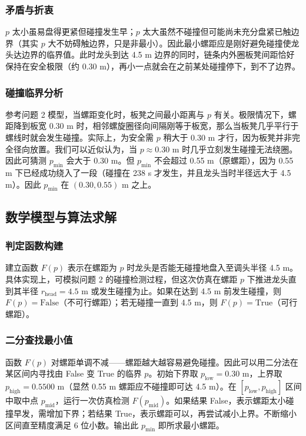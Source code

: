 \documentclass[UTF8]{ctexart}
\begin{document}
\subsubsection{矛盾与折衷}
$p$ 太小虽易盘得更紧但碰撞发生早；$p$ 太大虽然不碰撞但可能尚未充分盘紧已触边界（其实 $p$ 大不妨碍触边界，只是非最小）。因此最小螺距应是刚好避免碰撞使龙头达边界的临界值。此时龙头到达 4.5 m 边界的同时，链条内外圈板凳间距恰好保持在安全极限（约 0.30 m），再小一点就会在之前某处碰撞停下，到不了边界。

\subsubsection{碰撞临界分析}
参考问题 2 模型，当螺距变化时，板凳之间最小距离与 $p$ 有关。极限情况下，螺距降到板宽 0.30 m 时，相邻螺旋圈径向间隔刚等于板宽，那么当板凳几乎平行于螺线时就会发生碰撞。实际上，为安全需 $p$ 稍大于 0.30 m 才行，因为板凳并非完全径向放置。我们可以近似认为，当 $p \approx 0.30$ m 时几乎立刻发生碰撞无法绕圈。因此可猜测 $p_{\min}$ 会大于 0.30 m。但 $p_{\min}$ 不会超过 0.55 m（原螺距），因为 0.55 m 下已经成功绕入了一段（碰撞在 238 s 才发生，并且龙头当时半径远大于 4.5 m）。因此 $p_{\min}$ 在 $(0.30, 0.55)$ m 之上。

\subsection{数学模型与算法求解}

\subsubsection{判定函数构建}
建立函数 $F(p)$ 表示在螺距为 $p$ 时龙头是否能无碰撞地盘入至调头半径 4.5 m。具体实现上，可模拟问题 2 的碰撞检测过程，但这次仿真在螺距 $p$ 下推进龙头直到其半径 $r_{\text{head}}=4.5$ m 或发生碰撞为止。如果在达到 4.5 m 前发生碰撞，则 $F(p)=\text{False}$（不可行螺距）；若无碰撞一直到 4.5 m，则 $F(p)=\text{True}$（可行螺距）。

\subsubsection{二分查找最小值}
函数 $F(p)$ 对螺距单调不减——螺距越大越容易避免碰撞。因此可以用二分法在某区间内寻找由 False 变 True 的临界 $p$。初始下界取 $p_{\text{low}}=0.30$ m，上界取 $p_{\text{high}}=0.5500$ m（显然 0.55 m 螺距应不碰撞即可达 4.5 m）。在 $[p_{\text{low}},p_{\text{high}}]$ 区间中取中点 $p_{\text{mid}}$，运行一次仿真检测 $F(p_{\text{mid}})$。如果结果 False，表示螺距太小碰撞早发，需增加下界；若结果 True，表示螺距可以，再尝试减小上界。不断缩小区间直至精度满足 6 位小数。输出此 $p_{\min}$ 即所求最小螺距。
\end{document}
